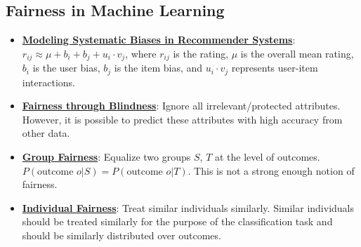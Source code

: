 \documentclass{article}%
\begin{document}
\subsection{Fairness in Machine Learning}%
\label{subsec:FairnessinMachineLearning}%
\begin{itemize}[leftmargin=*]%
\item \href{https://purdue.brightspace.com/d2l/common/assets/pdfjs-d2l-dist/1.0.14-legacy/web/viewer.html?file=\%2Fcontent\%2Fenforced\%2F1095467-wl.202510.CS.24300.001\%2F11L2-svd-pca-recommender.pdf\%3Fou\%3D1095467\&lang=en-us\&container=d2l-fileviewer-rendered-pdf\&fullscreen=d2l-fileviewer-rendered-pdf-dialog\&height=667#page=44}{\textbf{Modeling Systematic Biases in Recommender Systems}}: $r_{ij} \approx \mu + b_i + b_j + u_i \cdot v_j$, where $r_{ij}$ is the rating, $\mu$ is the overall mean rating, $b_i$ is the user bias, $b_j$ is the item bias, and $u_i \cdot v_j$ represents user-item interactions.%
\item \href{https://purdue.brightspace.com/d2l/common/assets/pdfjs-d2l-dist/1.0.14-legacy/web/viewer.html?file=\%2Fcontent\%2Fenforced\%2F1095467-wl.202510.CS.24300.001\%2F16L2-ethics.pdf\%3Fou\%3D1095467\&lang=en-us\&container=d2l-fileviewer-rendered-pdf\&fullscreen=d2l-fileviewer-rendered-pdf-dialog\&height=667#page=25}{\textbf{Fairness through Blindness}}: Ignore all irrelevant/protected attributes. However, it is possible to predict these attributes with high accuracy from other data.%
\item \href{https://purdue.brightspace.com/d2l/common/assets/pdfjs-d2l-dist/1.0.14-legacy/web/viewer.html?file=\%2Fcontent\%2Fenforced\%2F1095467-wl.202510.CS.24300.001\%2F16L2-ethics.pdf\%3Fou\%3D1095467\&lang=en-us\&container=d2l-fileviewer-rendered-pdf\&fullscreen=d2l-fileviewer-rendered-pdf-dialog\&height=667#page=26}{\textbf{Group Fairness}}: Equalize two groups $S$, $T$ at the level of outcomes. $P(\text{outcome } o | S) = P(\text{outcome } o | T)$. This is not a strong enough notion of fairness.%
\item \href{https://purdue.brightspace.com/d2l/common/assets/pdfjs-d2l-dist/1.0.14-legacy/web/viewer.html?file=\%2Fcontent\%2Fenforced\%2F1095467-wl.202510.CS.24300.001\%2F16L2-ethics.pdf\%3Fou\%3D1095467\&lang=en-us\&container=d2l-fileviewer-rendered-pdf\&fullscreen=d2l-fileviewer-rendered-pdf-dialog\&height=667#page=27}{\textbf{Individual Fairness}}: Treat similar individuals similarly. Similar individuals should be treated similarly for the purpose of the classification task and should be similarly distributed over outcomes.%
\end{itemize}
\end{document}

